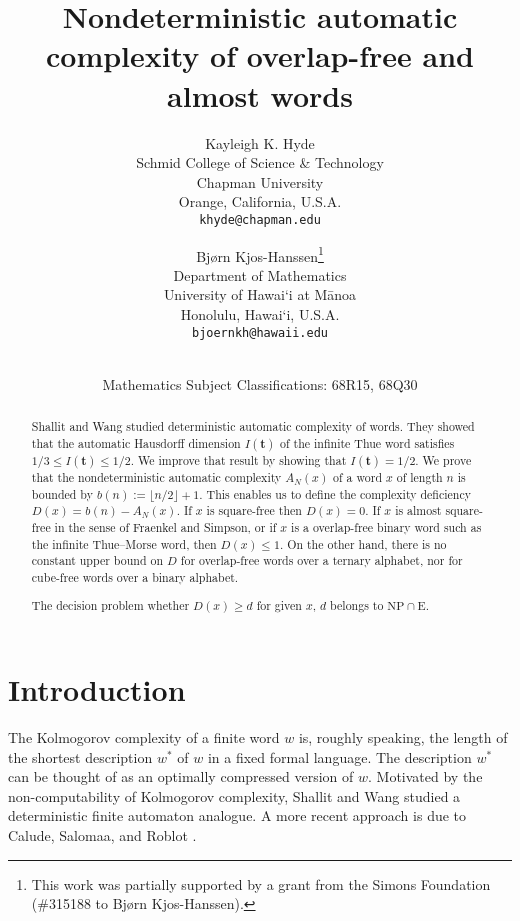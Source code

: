 \documentclass[12pt]{article}
\title{
	Nondeterministic automatic complexity of overlap-free and almost {\squarefree} words
}
\author{Kayleigh K. Hyde\\
\small Schmid College of Science \& Technology\\[-0.8ex]
\small Chapman University\\[-0.8ex] 
\small Orange, California, U.S.A.\\
\small\tt khyde@chapman.edu\\
\and
Bj{\o}rn Kjos-Hanssen\thanks{This work was partially supported by a grant from the Simons Foundation (\#315188 to Bj\o rn Kjos-Hanssen).}\\
\small Department of Mathematics\\[-0.8ex]
\small University of Hawai\textquoteleft i at M\=anoa\\[-0.8ex]
\small Honolulu, Hawai\textquoteleft i, U.S.A.\\
\small\tt bjoernkh@hawaii.edu\\
}
\date{
	\dateline{November 24, 2014}{July 29, 2015}\\
	\small Mathematics Subject Classifications: 68R15, 68Q30
}
\theoremstyle{plain}
\theoremstyle{definition}
\theoremstyle{remark}
\begin{document}
	\maketitle{}
	\begin{abstract}
		Shallit and Wang studied deterministic automatic complexity of words. 
		They showed that the automatic Hausdorff dimension $I(\mathbf t)$ of the infinite Thue word satisfies $1/3\le I(\mathbf t)\le 1/2$.
		We improve that result by showing that $I(\mathbf t)= 1/2$.
		We prove that the nondeterministic automatic complexity $A_N(x)$ of a word $x$ of length $n$ is bounded by $b(n):=\lfloor n/2\rfloor + 1$.
		This enables us to define the complexity deficiency $D(x)=b(n)-A_N(x)$.
		If $x$ is square-free then $D(x)=0$. If $x$ is almost square-free in the sense of Fraenkel and Simpson,
		or if $x$ is a overlap-free binary word such as the infinite Thue--Morse word, then $D(x)\le 1$.
		On the other hand, there is no constant upper bound on $D$ for overlap-free words over a ternary alphabet,
		nor for cube-free words over a binary alphabet.
		
		
		
		The decision problem whether $D(x)\ge d$ for given $x$, $d$ belongs to $\mathrm{NP}\cap \mathrm{E}$.
	\end{abstract}

	\section{Introduction}
		The Kolmogorov complexity of a finite word $w$ is, roughly speaking,
		the length of the shortest description $w^*$ of $w$ in a fixed formal language.
		The description $w^*$ can be thought of as an optimally compressed version of $w$.
		Motivated by the non-computability of Kolmogorov complexity,
		Shallit and Wang \cite{MR1897300} studied a deterministic finite automaton analogue.
		A more recent approach is due to Calude, Salomaa, and Roblot \cite{Calude}.
\end{document}
